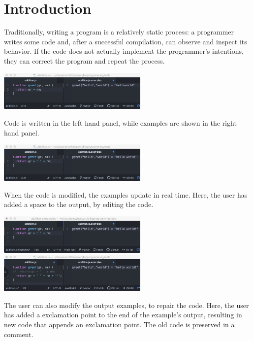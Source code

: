 \section{Introduction}
\label{sec:intro}


Traditionally, writing a program is a relatively static process: a programmer writes some code and, after a successful compilation, can observe and inspect its behavior. If the code does not actually implement the programmer's intentions, they can correct the program and repeat the process.

\begin{marginfigure}
	\setlength{\abovecaptionskip}{0.1pt plus 0.1pt minus 0.1pt}
	\includegraphics[width=0.55\textwidth]{figures/initial_greet}
	\caption{Code is written in the left hand panel,
	while examples are shown in the right hand panel.}
	\label{fig:init}
\end{marginfigure}
\begin{marginfigure}
	\setlength{\abovecaptionskip}{0.1pt plus 0.1pt minus 0.1pt}
	\includegraphics[width=0.55\textwidth]{figures/manual_change}
	\caption{When the code is modified, the examples update in real time.
	Here, the user has added a space to the output, by editing the code.}
	\label{fig:man_change}
\end{marginfigure}
\begin{marginfigure}
	\setlength{\abovecaptionskip}{0.1pt plus 0.1pt minus 0.1pt}
	\includegraphics[width=0.55\textwidth]{figures/pbe_before}
	\includegraphics[width=0.55\textwidth]{figures/pbe_after}
	\caption{The user can also modify the output examples, to repair the code.  Here, the
	user has added a exclamation point to the end of the example's output, resulting in new code that appends an exclamation point.  The old code is preserved in a comment.}
	\label{fig:pbe}
\end{marginfigure}

